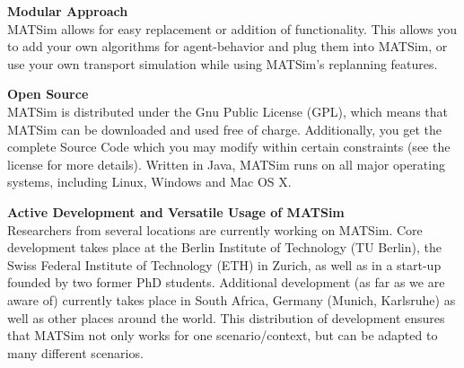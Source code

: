\textbf{Modular Approach
\\}MATSim  allows for easy replacement or addition of functionality. This allows  you to add your own algorithms for agent-behavior and plug them into  MATSim, or use your own transport simulation while using MATSim's  replanning features.

\textbf{Open Source}
\\ MATSim is  distributed under the Gnu Public License (GPL), which means that MATSim  can be downloaded and used free of charge. Additionally, you get the  complete Source Code which you may modify within certain constraints  (see the license for more details). Written in Java, MATSim runs on all  major operating systems, including Linux, Windows and Mac OS X.

\textbf{Active Development and Versatile Usage of MATSim}
\\  Researchers from several locations are currently working on MATSim.  Core development takes place at the Berlin Institute of Technology (TU  Berlin), the Swiss Federal Institute of Technology (ETH) in Zurich, as  well as in a start-up founded by two former PhD students. Additional  development (as far as we are aware of) currently takes place in South  Africa, Germany (Munich, Karlsruhe) as well as other places around the  world. This distribution of development ensures that MATSim not only  works for one scenario/context, but can be adapted to many different  scenarios.
